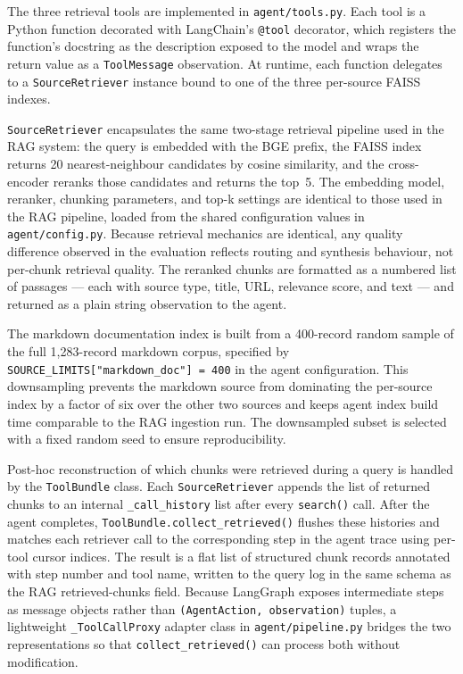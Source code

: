 The three retrieval tools are implemented in \texttt{agent/tools.py}. Each tool is a Python function decorated with LangChain's \texttt{@tool} decorator, which registers the function's docstring as the description exposed to the model and wraps the return value as a \texttt{ToolMessage} observation. At runtime, each function delegates to a \texttt{SourceRetriever} instance bound to one of the three per-source FAISS indexes.

\texttt{SourceRetriever} encapsulates the same two-stage retrieval pipeline used in the RAG system: the query is embedded with the BGE prefix, the FAISS index returns 20 nearest-neighbour candidates by cosine similarity, and the cross-encoder reranks those candidates and returns the top~5. The embedding model, reranker, chunking parameters, and top-k settings are identical to those used in the RAG pipeline, loaded from the shared configuration values in \texttt{agent/config.py}. Because retrieval mechanics are identical, any quality difference observed in the evaluation reflects routing and synthesis behaviour, not per-chunk retrieval quality. The reranked chunks are formatted as a numbered list of passages — each with source type, title, URL, relevance score, and text — and returned as a plain string observation to the agent.

The markdown documentation index is built from a 400-record random sample of the full 1,283-record markdown corpus, specified by \texttt{SOURCE\_LIMITS["markdown\_doc"] = 400} in the agent configuration. This downsampling prevents the markdown source from dominating the per-source index by a factor of six over the other two sources and keeps agent index build time comparable to the RAG ingestion run. The downsampled subset is selected with a fixed random seed to ensure reproducibility.

Post-hoc reconstruction of which chunks were retrieved during a query is handled by the \texttt{ToolBundle} class. Each \texttt{SourceRetriever} appends the list of returned chunks to an internal \texttt{\_call\_history} list after every \texttt{search()} call. After the agent completes, \texttt{ToolBundle.collect\_retrieved()} flushes these histories and matches each retriever call to the corresponding step in the agent trace using per-tool cursor indices. The result is a flat list of structured chunk records annotated with step number and tool name, written to the query log in the same schema as the RAG retrieved-chunks field. Because LangGraph exposes intermediate steps as message objects rather than \texttt{(AgentAction, observation)} tuples, a lightweight \texttt{\_ToolCallProxy} adapter class in \texttt{agent/pipeline.py} bridges the two representations so that \texttt{collect\_retrieved()} can process both without modification.

